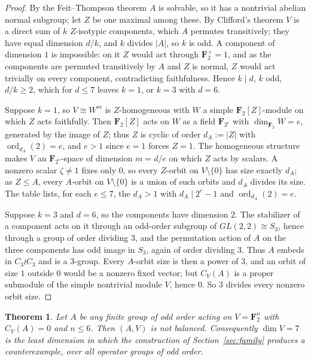 \documentclass[11pt,a4paper,reqno]{amsart}
\newtheorem{theorem}{Theorem}[section]
\theoremstyle{definition}
\theoremstyle{remark}
\newcommand{\F}{\mathbf F}
\begin{document}
\begin{proof}
By the Feit--Thompson theorem \cite{feit-thompson} $A$ is solvable, so
it has a nontrivial abelian normal subgroup; let $Z$ be one maximal
among these.  By Clifford's theorem \cite{clifford} $V$ is a direct
sum of $k$ $Z$-isotypic components,
which $A$ permutes transitively; they have equal dimension $d/k$, and
$k$ divides $|A|$, so $k$ is odd.  A component of dimension $1$ is
impossible: on it $Z$ would act through $\F_2^\times=1$, and as the
components are permuted transitively by $A$ and $Z$ is normal, $Z$
would act trivially on every component, contradicting faithfulness.
Hence $k\mid d$, $k$ odd, $d/k\ge2$, which for $d\le7$ leaves $k=1$, or
$k=3$ with $d=6$.

Suppose $k=1$, so $V\cong W^m$ is $Z$-homogeneous with $W$ a simple
$\F_2[Z]$-module on which $Z$ acts faithfully.  Then $\F_2[Z]$ acts on
$W$ as a field $\F_{2^e}$ with $\dim_{\F_2}W=e$, generated by the image
of $Z$; thus $Z$ is cyclic of order $d_A:=|Z|$ with
$\operatorname{ord}_{d_A}(2)=e$, and $e>1$ since $e=1$ forces $Z=1$.
The homogeneous structure makes $V$ an $\F_{2^e}$-space of dimension
$m=d/e$ on which $Z$ acts by scalars.  A nonzero scalar
$\zeta\neq1$ fixes only $0$, so every $Z$-orbit on $V\setminus\{0\}$
has size exactly $d_A$; as $Z\le A$, every $A$-orbit on
$V\setminus\{0\}$ is a union of such orbits and $d_A$ divides its size.
The table lists, for each $e\le7$, the $d_A>1$ with
$d_A\mid2^e-1$ and $\operatorname{ord}_{d_A}(2)=e$.

Suppose $k=3$ and $d=6$, so the components have dimension $2$.  The
stabilizer of a component acts on it through an odd-order subgroup of
$GL(2,2)\cong S_3$, hence through a group of order dividing $3$, and
the permutation action of $A$ on the three components has odd image in
$S_3$, again of order dividing $3$.  Thus $A$ embeds in
$C_3\wr C_3$ and is a $3$-group.  Every $A$-orbit size is then a power
of $3$, and an orbit of size $1$ outside $0$ would be a nonzero fixed
vector; but $C_V(A)$ is a proper submodule of the simple nontrivial
module $V$, hence $0$.  So $3$ divides every nonzero orbit size.
\end{proof}

\begin{theorem}\label{thm:dim-six}
Let $A$ be any finite group of odd order acting on $V=\F_2^n$ with
$C_V(A)=0$ and $n\le6$.  Then $(A,V)$ is not balanced.  Consequently
$\dim V=7$ is the least dimension in which the construction of
Section~\ref{sec:family} produces a counterexample, over all operator
groups of odd order.
\end{theorem}
\end{document}
